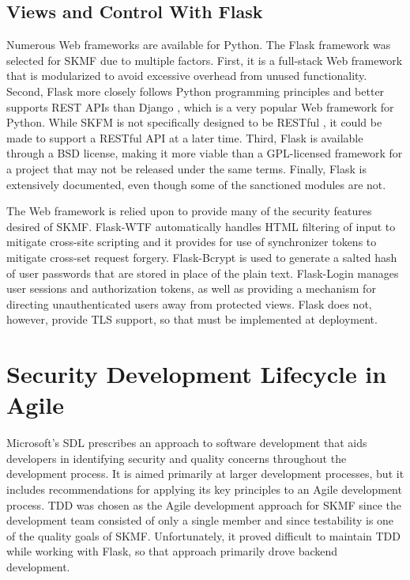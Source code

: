 \subsection{Views and Control With Flask}
\label{method:flask}

Numerous Web frameworks are available for Python. The Flask framework
\cite{flask}
was selected for SKMF due to multiple factors. First, it is a full-stack Web framework that is modularized to avoid excessive overhead from unused functionality. Second, Flask more closely follows Python programming principles and better supports REST APIs than Django
\cite{django},
which is a very popular Web framework for Python. While SKFM is not specifically designed to be RESTful
\cite{restful},
it could be made to support a RESTful API at a later time. Third, Flask is available through a BSD license, making it more viable than a GPL-licensed framework for a project that may not be released under the same terms. Finally, Flask is extensively documented, even though some of the sanctioned modules are not.

The Web framework is relied upon to provide many of the security features desired of SKMF. Flask-WTF
\cite{flask-wtf}
automatically handles HTML filtering of input to mitigate cross-site scripting and it provides for use of synchronizer tokens to mitigate cross-set request forgery. Flask-Bcrypt
\cite{flask-bcrypt}
is used to generate a salted hash of user passwords that are stored in place of the plain text. Flask-Login
\cite{flask-login}
manages user sessions and authorization tokens, as well as providing a mechanism for directing unauthenticated users away from protected views. Flask does not, however, provide TLS support, so that must be implemented at deployment.


\section{Security Development Lifecycle in Agile}
\label{method:sdl}

Microsoft's SDL
\cite{secdevlifecycle}
prescribes an approach to software development that aids developers in identifying security and quality concerns throughout the development process. It is aimed primarily at larger development processes, but it includes recommendations for applying its key principles to an Agile development process. TDD was chosen as the Agile development approach for SKMF since the development team consisted of only a single member and since testability is one of the quality goals of SKMF. Unfortunately, it proved difficult to maintain TDD while working with Flask, so that approach primarily drove backend development.


